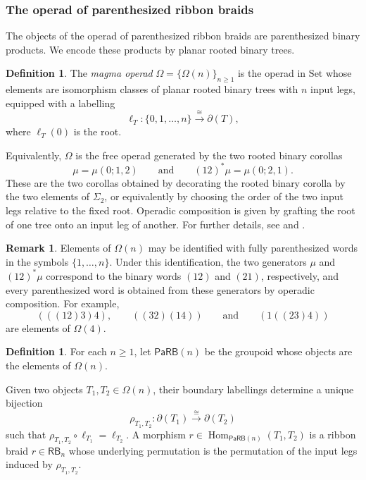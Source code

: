 \documentclass{amsart}
\newcommand{\Set}{\mathrm{Set}}
\newcommand{\PaRB}{\mathsf{PaRB}}
\newcommand{\Hom}{\operatorname{Hom}}
\newcommand{\RB}{\mathsf{RB}} %
\theoremstyle{definition}
\newtheorem{definition}[theorem]{Definition}%
\newtheorem{remark}[theorem]{Remark}%
\numberwithin{equation}{section}
\begin{document}
\subsubsection{The operad of parenthesized ribbon braids} 
The objects of the operad of parenthesized ribbon braids are parenthesized binary products. We encode these products by planar rooted binary trees.%
\begin{definition}\label{def: magma operad}
The \emph{magma operad} $\Omega=\{\Omega(n)\}_{n\geq 1}$ is the operad in $\Set$ whose elements are isomorphism classes of planar rooted binary trees with $n$ input legs, equipped with a labelling
\[
\ell_T:\{0,1,\dots,n\}\xrightarrow{\cong}\partial(T),
\]
where $\ell_T(0)$ is the root.

Equivalently, $\Omega$ is the free operad generated by the two rooted binary corollas
\[
\mu=\mu(0;1,2)
\qquad\text{and}\qquad
(12)^*\mu=\mu(0;2,1).
\]
These are the two corollas obtained by decorating the rooted binary corolla by the two elements of $\Sigma_2$, or equivalently by choosing the order of the two input legs relative to the fixed root. Operadic composition is given by grafting the root of one tree onto an input leg of another. For further details, see \cite[Section~6.1]{FresseBook1} and \cite[Definition~6.10]{Boavida-Horel-Robertson}.
\end{definition}

\begin{remark}
Elements of $\Omega(n)$ may be identified with fully parenthesized words in the symbols $\{1,\dots,n\}$. Under this identification, the two generators $\mu$ and $(12)^*\mu$ correspond to the binary words $(12)$ and $(21)$, respectively, and every parenthesized word is obtained from these generators by operadic composition. For example,
\[
(((12)3)4), \qquad ((32)(14)) \qquad \text{and} \qquad (1((23)4))
\]
are elements of $\Omega(4)$.
\end{remark}

\begin{definition}
For each $n\geq 1$, let $\PaRB(n)$ be the groupoid whose objects are the elements of $\Omega(n)$. %

Given two objects $T_1,T_2\in\Omega(n)$, their boundary labellings determine a unique bijection
\[
\rho_{T_1,T_2}:\partial(T_1)\xrightarrow{\cong}\partial(T_2)
\]
such that $\rho_{T_1,T_2}\circ \ell_{T_1}=\ell_{T_2}$. A morphism $r\in \Hom_{\PaRB(n)}(T_1,T_2)$ is a ribbon braid $r\in \RB_n$ whose underlying permutation is the permutation of the input legs induced by $\rho_{T_1,T_2}$.
\end{definition}
\end{document}
